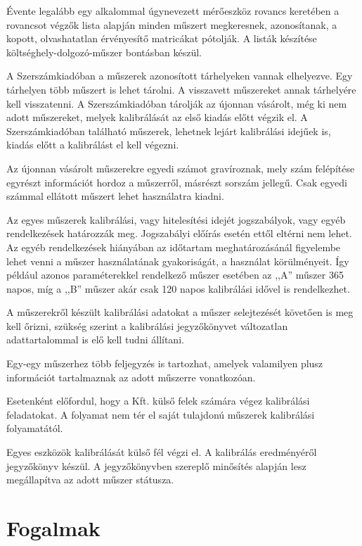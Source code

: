 \documentclass[a4paper,12pt]{report}
\begin{document}
Évente legalább egy alkalommal úgynevezett mérőeszköz rovancs keretében a
rovancsot végzők lista alapján minden műszert megkeresnek, azonosítanak, a kopott, 
olvashatatlan érvényesítő matricákat pótolják. A listák készítése 
költséghely-dolgozó-műszer bontásban készül.
 
A Szerszámkiadóban a műszerek azonosított tárhelyeken vannak elhelyezve. 
Egy tárhelyen több műszert is lehet tárolni. A visszavett műszereket annak 
tárhelyére kell visszatenni. A Szerszámkiadóban tárolják az újonnan vásárolt, 
még ki nem adott műszereket, melyek kalibrálását az első kiadás előtt végzik 
el. A Szerszámkiadóban található műszerek, lehetnek lejárt kalibrálási idejűek 
is, kiadás előtt a kalibrálást el kell végezni.

Az újonnan vásárolt műszerekre egyedi számot gravíroznak, mely szám felépítése 
egyrészt információt hordoz a műszerről, másrészt sorszám jellegű. Csak egyedi 
számmal ellátott műszert lehet használatra kiadni. 

Az egyes műszerek kalibrálási, vagy hitelesítési idejét jogszabályok, vagy egyéb
rendelkezések határozzák meg. Jogszabályi előírás esetén ettől eltérni nem 
lehet. Az egyéb rendelkezések hiányában az időtartam meghatározásánál figyelembe
lehet venni a műszer használatának gyakoriságát, a használat körülményeit.
Így például azonos paraméterekkel rendelkező műszer esetében az ,,A'' műszer
365 napos, míg a ,,B'' műszer akár csak 120 napos kalibrálási idővel is rendelkezhet.

A műszerekről készült kalibrálási adatokat a műszer selejtezését követően is 
meg kell őrizni, szükség szerint a kalibrálási jegyzőkönyvet változatlan 
adattartalommal is elő kell tudni állítani.

Egy-egy műszerhez több feljegyzés is tartozhat, amelyek valamilyen plusz 
információt tartalmaznak az adott műszerre vonatkozóan. 

Esetenként előfordul, hogy a Kft. külső felek számára végez kalibrálási 
feladatokat. A folyamat nem tér el saját tulajdonú műszerek kalibrálási 
folyamatától.

Egyes eszközök kalibrálását külső fél végzi el. A kalibrálás eredményéről jegyzőkönyv
készül. A jegyzőkönyvben szereplő minősítés alapján lesz megállapítva az adott műszer státusza.

\section{Fogalmak}
\let\clearpage\relax

\end{document}
